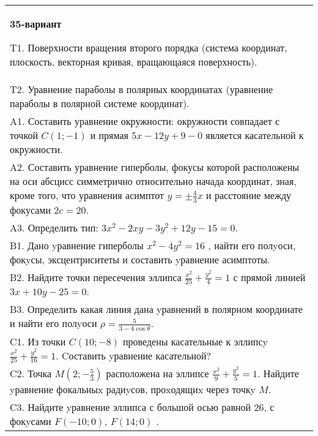 \documentclass{article}
\begin{document}
\begin{tabular}{m{17cm}}
\textbf{35-вариант}
\newline

T1. Поверхности вращения второго порядка (система координат, плоскость, векторная кривая, вращающаяся поверхность).\\

T2. Уравнение параболы в полярных координатах (уравнение параболы в полярной системе координат).\\

A1. Составить уравнение окружности: окружности совпадает с точкой $C(1;-1)$ и прямая $5x-12y+9-0$ является касательной к окружности.\\

A2. Составить уравнение гиперболы, фокусы которой расположены на оси абсцисс симметрично относительно начада координат, зная, кроме того, что уравнения асимптот $y=\pm \frac{4}{3}x$ и расстояние между фокусами $2c=20$.\\

A3. Определить тип: $3x^{2}-2xy-3y^{2}+12y-15=0$.\\

B1. Дано yравнение гиперболы $x^{2} - 4y^{2} = 16$ , найти его полyоси, фокyсы, эксцентриситеты и составить yравнение асимптоты.\\

B2. Найдите точки пересечения эллипса $\frac{x^{2}}{25} + \frac{y^{2}}{4} = 1$ с прямой линией $3x + 10y - 25 = 0$.  \\

B3. Определить какая линия дана yравнений в полярном координате и найти его полyоси $\rho = \frac{5}{3 - 4\cos\theta}$.  \\

C1. Из точки $C(10;-8)$ проведены касательные к эллипсy $\frac{x^{2}}{25}+\frac{y^{2}}{16}=1$. Cоставить yравнение касательной?  \\

C2. Точка $M(2;-\frac{5}{3})$ расположена на эллипсе $\frac{x^{2}}{9}+\frac{y^{2}}{5}=1$. Найдите yравнение фокальныx радиyсов, проxодящиx через точкy $M$.  \\

C3. Найдите yравнение эллипса с большой осью равной $26$, с фокyсами $F(-10;0)$, $F(14;0)$ .  \\

\end{tabular}
\vspace{1cm}
\end{document}
